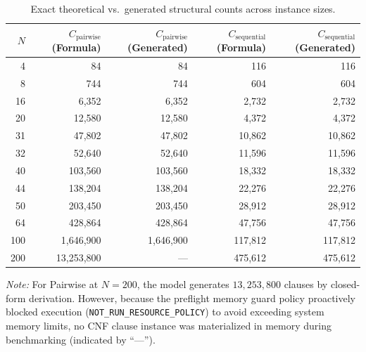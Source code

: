 \begin{table}[htbp]
\centering
\caption{Exact theoretical vs.\ generated structural counts across instance sizes.}
\label{tab:appendix_verification}
\begin{tabular}{rrrrr}
\toprule
$N$ & $C_{\text{pairwise}}$ (Formula) & $C_{\text{pairwise}}$ (Generated) & $C_{\text{sequential}}$ (Formula) & $C_{\text{sequential}}$ (Generated) \\
\midrule
4    & 84             & 84             & 116            & 116            \\
8    & 744            & 744            & 604            & 604            \\
16   & 6,352          & 6,352          & 2,732          & 2,732          \\
20   & 12,580         & 12,580         & 4,372          & 4,372          \\
31   & 47,802         & 47,802         & 10,862         & 10,862         \\
32   & 52,640         & 52,640         & 11,596         & 11,596         \\
40   & 103,560        & 103,560        & 18,332         & 18,332         \\
44   & 138,204        & 138,204        & 22,276         & 22,276         \\
50   & 203,450        & 203,450        & 28,912         & 28,912         \\
64   & 428,864        & 428,864        & 47,756         & 47,756         \\
100  & 1,646,900      & 1,646,900      & 117,812        & 117,812        \\
200  & 13,253,800     & ---            & 475,612        & 475,612        \\
\bottomrule
\end{tabular}
\par\vspace{1ex}
\begin{minipage}{\linewidth}
\footnotesize \textit{Note:} For Pairwise at $N=200$, the model generates $13,253,800$ clauses by closed-form derivation. However, because the preflight memory guard policy proactively blocked execution (\texttt{NOT\_RUN\_RESOURCE\_POLICY}) to avoid exceeding system memory limits, no CNF clause instance was materialized in memory during benchmarking (indicated by ``---'').
\end{minipage}
\end{table}

